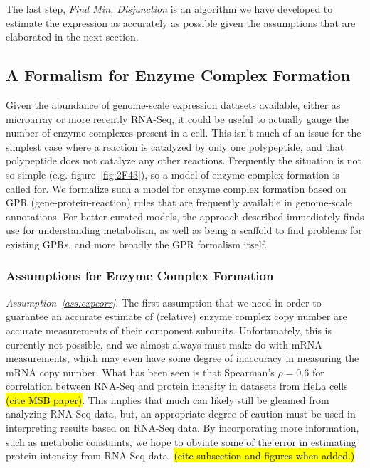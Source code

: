 \documentclass[phd,tocprelim]{cornell}
\theoremstyle{break}
\theoremstyle{empty}
\begin{document}
The last step, \emph{Find Min. Disjunction} is an algorithm we have
developed to estimate the expression as accurately as possible given
the assumptions that are elaborated in the next section.

\subsection{A Formalism for Enzyme Complex Formation}

Given the abundance of genome-scale expression datasets available, either as microarray or more
recently RNA-Seq, it could be useful to actually gauge the number of enzyme complexes present 
in a cell. This isn't much of an issue for the simplest case where a reaction is
catalyzed by only one polypeptide, and that polypeptide does not catalyze any other reactions.
Frequently the situation is not so simple (e.g. figure~\ref{fig:2F43}), 
so a model of enzyme complex formation is called for.
We formalize such a model for enzyme complex formation based 
on GPR (gene-protein-reaction) rules that are frequently available
in genome-scale annotations. For better curated models, the approach described immediately finds
use for understanding metabolism, as well as being a scaffold to find problems for
existing GPRs, and more broadly the GPR formalism itself.

\subsubsection{Assumptions for Enzyme Complex Formation}
\emph{Assumption~\ref{ass:expcorr}.}
The first assumption that we need in order to guarantee an accurate
estimate of (relative) enzyme complex copy number are accurate
measurements of their component subunits. Unfortunately, this is
currently not possible, and we almost always must make do with mRNA
measurements, which may even have some degree of inaccuracy in
measuring the mRNA copy number. What has been seen is that Spearman's
$\rho = 0.6$ for correlation between RNA-Seq and protein inensity in
datasets from HeLa cells \hl{(cite MSB paper)}. This implies that much
can likely still be gleamed from analyzing RNA-Seq data, but, an
appropriate degree of caution must be used in interpreting results
based on RNA-Seq data. By incorporating more information, such as
metabolic constaints, we hope to obviate some of the error in
estimating protein intensity from RNA-Seq data. \hl{(cite subsection
and figures when added.)}
\end{document}
